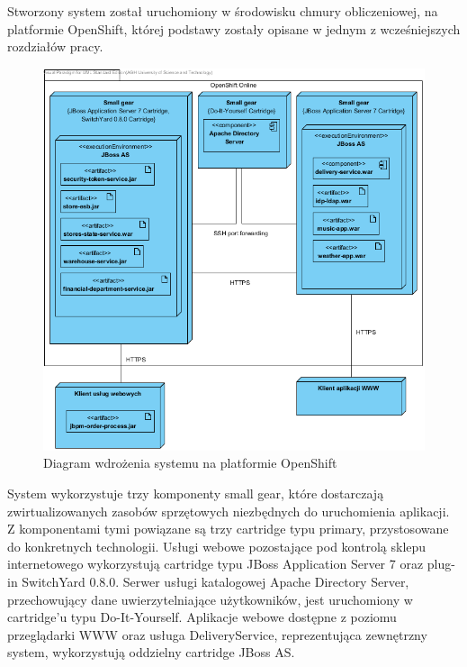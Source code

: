 
	Stworzony system został uruchomiony w środowisku chmury obliczeniowej, na platformie OpenShift, której podstawy zostały opisane w jednym z wcześniejszych rozdziałów pracy.  
	
		\begin{figure}[!htb]
			\centering
			\hspace*{-0.7in}
			\includegraphics{img/OpenShiftDeployment.png}
			\caption{Diagram wdrożenia systemu na platformie OpenShift}
			\label{OpenShiftDeployment}
		\end{figure}
	
	System wykorzystuje trzy komponenty small gear, które dostarczają zwirtualizowanych zasobów sprzętowych niezbędnych do uruchomienia aplikacji. Z komponentami tymi powiązane są trzy cartridge typu primary, przystosowane do konkretnych technologii. Usługi webowe pozostające pod kontrolą sklepu internetowego wykorzystują cartridge typu JBoss Application Server 7 oraz plug-in SwitchYard 0.8.0. Serwer usługi katalogowej Apache Directory Server, przechowujący dane uwierzytelniające użytkowników, jest uruchomiony w cartridge’u typu Do-It-Yourself. Aplikacje webowe dostępne z poziomu przeglądarki WWW oraz usługa DeliveryService, reprezentująca zewnętrzny system, wykorzystują oddzielny cartridge JBoss AS.
	
